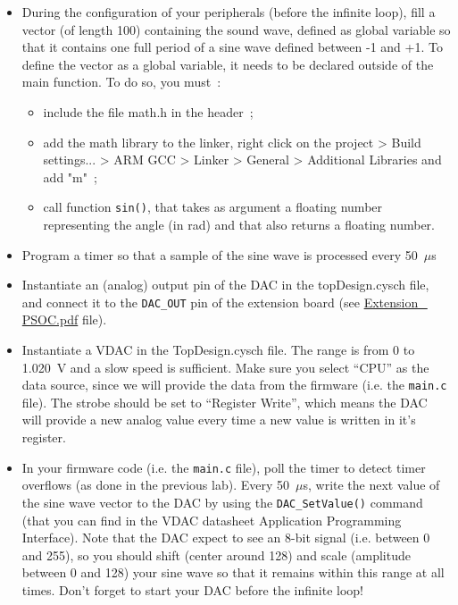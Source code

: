 \begin{itemize}
	\item During the configuration of your peripherals (before the infinite loop), fill a vector (of length 100) containing the sound wave, defined as global variable so that it contains one full period of a sine wave defined between -1 and +1. To define the vector as a global variable, it needs to be declared outside of the main function. 
    To do so, you must~:
	\begin{itemize}
		\item include the file math.h in the header~;
		\item add the math library to the linker, right click on the project > Build settings... > ARM GCC > Linker > General > Additional Libraries and add "m"~;
		\item call function \texttt{sin()}, that takes as argument a floating number representing the angle (in rad) and that also returns a floating number.
	\end{itemize}
	\item Program a timer so that a sample of the sine wave is processed every 50~$\mu$s
	\item Instantiate an (analog) output pin of the DAC in the topDesign.cysch file, and connect it to the \texttt{DAC\_OUT} pin of the extension board (see \url{Extension\_ PSOC.pdf} file). 
	\item Instantiate a VDAC in the TopDesign.cysch file. The range is from 0 to 1.020~V and a slow speed is sufficient. Make sure you select ``CPU'' as the data source, since we will provide the data from the firmware (i.e. the \texttt{main.c} file). The strobe should be set to ``Register Write'', which means the DAC will provide a new analog value every time a new value is written in it's register. 
	\item In your firmware code (i.e. the \texttt{main.c} file), poll the timer to detect timer overflows (as done in the previous lab). Every 50~$\mu$s, write the next value of the sine wave vector to the DAC by using the \texttt{DAC\_SetValue()} command (that you can find in the VDAC datasheet Application Programming Interface). Note that the DAC expect to see an 8-bit signal (i.e. between 0 and 255), so you should shift (center around 128) and scale (amplitude between 0 and 128) your sine wave so that it remains within this range at all times. Don't forget to start your DAC before the infinite loop! 
\end{itemize}





